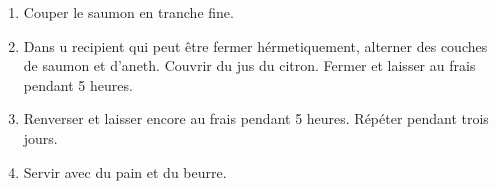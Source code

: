 
\begin{ingredients}
\end{ingredients}


\begin{recipe}
  \begin{enumerate}

  \item Couper le saumon en tranche fine.

  \item Dans u recipient qui peut \^etre fermer h\'ermetiquement,
  alterner des couches de saumon et d'aneth.  Couvrir du jus du
  citron.  Fermer et laisser au frais pendant 5 heures.

  \item Renverser et laisser encore au frais pendant 5 heures.
  R\'ep\'eter pendant trois jours.

  \item Servir avec du pain et du beurre.

  \end{enumerate}
\end{recipe}

